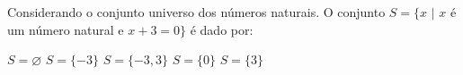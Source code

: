 \noindent\parbox{\linewidth}{

Considerando o conjunto universo dos números naturais. O conjunto $S=\{x\,\,|\,\,x$ é um número natural e $x+3=0\}$ é dado por:

$S=\varnothing$
$S=\{-3\}$
$S=\{-3,3\}$
$S=\{0\}$
$S=\{3\}$



}



